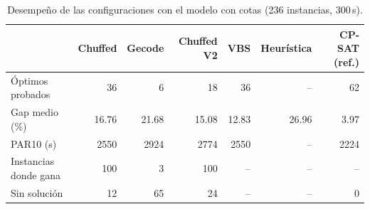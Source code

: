 \begin{table}[H]
  \centering
  \small
  \singlespacing
  \caption{Desempeño de las configuraciones con el modelo con cotas (236 instancias, 300\,s).}
  \label{tab:individual}
  \begin{tabular}{lrrrrrr}
    \toprule
     & Chuffed & Gecode & Chuffed V2 & VBS & Heurística & CP-SAT (ref.) \\
    \midrule
    Óptimos probados & 36 & 6 & 18 & 36 & -- & 62 \\
    Gap medio (\%) & 16.76 & 21.68 & 15.08 & 12.83 & 26.96 & 3.97 \\
    PAR10 (s) & 2550 & 2924 & 2774 & 2550 & -- & 2224 \\
    Instancias donde gana & 100 & 3 & 100 & -- & -- & -- \\
    Sin solución & 12 & 65 & 24 & -- & -- & 0 \\
    \bottomrule
  \end{tabular}
  \par\vspace{2pt}{\footnotesize Se excluyen las 6 instancias con lb $=$ ub. Sin solución: el resultado es la ub. VBS: la mejor configuración del portafolio en cada instancia.}
\end{table}
